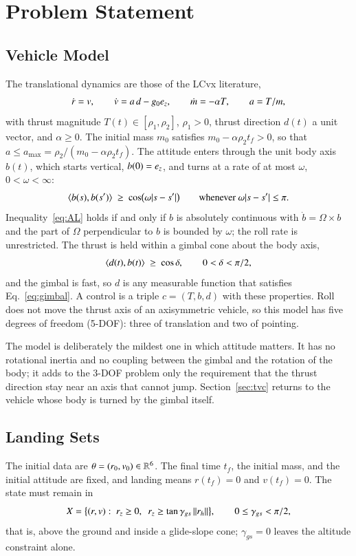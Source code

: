 \section{Problem Statement}\label{sec:problem}
\subsection{Vehicle Model}
The translational dynamics are those of the LCvx literature,
\begin{equation}\label{eq:dyn}
\dot r=v,\qquad \dot v=a\,d-g_0e_z,\qquad \dot m=-\alpha T,\qquad a=T/m ,
\end{equation}
with thrust magnitude $T(t)\in[\rho_1,\rho_2]$, $\rho_1>0$, thrust direction $d(t)$ a unit vector, and $\alpha\ge0$. The
initial mass $m_0$ satisfies $m_0-\alpha\rho_2t_f>0$, so that $a\le a_{\max}=\rho_2/(m_0-\alpha\rho_2t_f)$. The attitude enters
through the unit body axis $b(t)$, which starts vertical, $b(0)=e_z$, and turns at a rate of at most $\omega$,
$0<\omega<\infty$:
\begin{equation}\label{eq:AL}
\langle b(s),b(s')\rangle\ \ge\ \cos\bigl(\omega\lvert s-s'\rvert\bigr)\qquad\text{whenever }\omega\lvert s-s'\rvert\le\pi .
\end{equation}
Inequality~\eqref{eq:AL} holds if and only if $b$ is absolutely continuous with $\dot b=\Omega\times b$ and the part of
$\Omega$ perpendicular to $b$ is bounded by $\omega$; the roll rate is unrestricted. The thrust is held within a gimbal cone
about the body axis,
\begin{equation}\label{eq:gimbal}
\langle d(t),b(t)\rangle\ \ge\ \cos\delta,\qquad 0<\delta<\pi/2 ,
\end{equation}
and the gimbal is fast, so $d$ is any measurable function that satisfies Eq.~\eqref{eq:gimbal}. A control is a triple
$c=(T,b,d)$ with these properties. Roll does not move the thrust axis of an axisymmetric vehicle, so this model has five
degrees of freedom (5-DOF): three of translation and two of pointing.

The model is deliberately the mildest one in which attitude matters. It has no rotational inertia and no coupling between
the gimbal and the rotation of the body; it adds to the 3-DOF problem only the requirement that the thrust direction stay
near an axis that cannot jump. Section~\ref{sec:tvc} returns to the vehicle whose body is turned by the gimbal itself.

\subsection{Landing Sets}
The initial data are $\theta=(r_0,v_0)\in\mathbb{R}^6$. The final time $t_f$, the initial mass, and the initial attitude are fixed,
and landing means $r(t_f)=0$ and $v(t_f)=0$. The state must remain in
\begin{equation}\label{eq:X}
X=\bigl\{(r,v):\ r_z\ge0,\ \ r_z\ge\tan\gamma_{gs}\,\norm{r_h}\bigr\},\qquad 0\le\gamma_{gs}<\pi/2 ,
\end{equation}
that is, above the ground and inside a glide-slope cone; $\gamma_{gs}=0$ leaves the altitude constraint alone.

